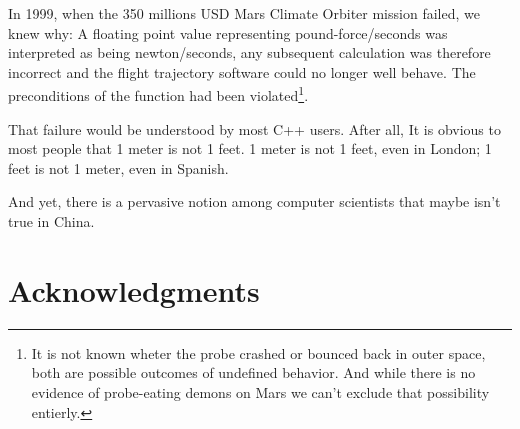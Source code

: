 \documentclass{wg21}
\begin{document}
In 1999, when the 350 millions USD Mars Climate Orbiter mission failed, we knew why:
A floating point value representing pound-force/seconds was interpreted as being newton/seconds, any subsequent calculation was therefore incorrect and the flight trajectory software could no longer well behave.
The preconditions of the function had been violated\footnote{It is not known wheter
the probe crashed or bounced back in outer space, both are possible outcomes
of undefined behavior. And while there is no evidence of probe-eating demons on Mars we can't exclude that possibility entierly.}.

That failure would be understood by most C++ users.
After all, It is obvious to most people that 1 meter is not 1 feet.
1 meter is not 1 feet, even in London; 1 feet is not 1 meter, even in Spanish.

And yet, there is a pervasive notion among computer scientists that
maybe  isn't true in China. 


\section{Acknowledgments}




\renewcommand{\section}[2]{}%
\begin{thebibliography}{9}
     
\end{thebibliography}
\end{document}
